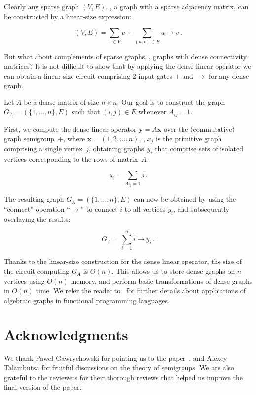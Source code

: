 \documentclass{toc}
\begin{document}
\noindent
Clearly any sparse graph $(V, E)$, \ie, a graph with a sparse
adjacency  %
matrix, can be constructed by a linear-size expression:

\[
(V, E) = \sum_{v \in V} v + \sum_{(u,v) \in E} u \rightarrow v\,.
\]

\noindent
But what about complements of sparse graphs, \ie, graphs with dense
connectivity matrices?  %
It is not difficult to show that by applying the dense
linear operator we can obtain a linear-size circuit comprising 2-input gates
$+$ and $\rightarrow$ for any dense graph.

Let $A$ be a dense matrix of size $n\times n$. Our goal is to construct the
graph $G_A = (\{1, \dots, n\}, E)$ such that $(i,j) \in E$ whenever $A_{ij}=1$.

First, we compute the dense linear operator $\mathbf{y} = A \mathbf{x}$ over the
(commutative) graph semigroup~$+$, where $\mathbf{x} = (1, 2, \dots, n)$, \ie,
$x_j$ is the primitive graph comprising a single vertex~$j$, obtaining
graphs~$y_i$ that comprise sets of isolated vertices corresponding to the rows
of matrix~$A$:

\[
y_i = \sum_{A_{ij}=1} j \, .
\]

The resulting graph $G_A = (\{1, \dots, n\}, E)$ can now be obtained by using
the %
``connect''  %
operation %
``$\rightarrow$''  %
to connect $i$ to all vertices $y_i$,  %
and subsequently overlaying the results:

\[
G_A = \sum_{i=1}^{n} i \rightarrow y_i\,.
\]

Thanks to the linear-size construction for the dense linear operator, the size
of the circuit computing $G_A$ is $O(n)$. This allows us to store dense graphs
on $n$ vertices using $O(n)$ memory, and perform basic transformations of dense
graphs in $O(n)$ time. We refer the reader to~\cite{mokhov2017algebraic} for
further details about applications of algebraic graphs in functional programming
languages.


\section*{Acknowledgments}
We thank 
Pawe\l{} Gawrychowski 
for pointing us to the
paper~\cite{DBLP:journals/ijcga/ChazelleR91}, and Alexey Talambutsa for
fruitful discussions on the theory of semigroups.
We are also grateful to the reviewers for their thorough reviews that helped us
improve the final version of the paper.
\end{document}
